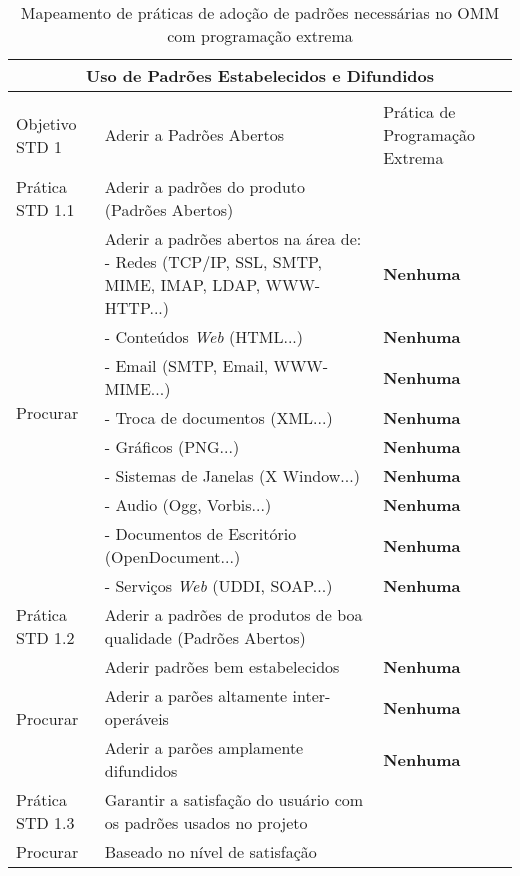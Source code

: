 \begin{longtable}{|p{2cm}|p{7cm}|p{7cm}|}
  \caption{Mapeamento de práticas de adoção de padrões necessárias no
    OMM com
    programação extrema} \\
  \multicolumn{3}{|c|}{\cellcolor[gray]{0.6} Uso de Padrões
    Estabelecidos e Difundidos}\\
  \endhead
  & & \\
  \hline \cellcolor[gray]{0.6} Objetivo STD 1 & \cellcolor[gray]{0.6}
  Aderir a Padrões Abertos & Prática de Programação Extrema \\
  \hline \cellcolor[gray]{0.9} Prática STD 1.1 & \cellcolor[gray]{0.9}
  Aderir a padrões do produto (Padrões Abertos) & \\
  \hline \multirow{9}{*}{Procurar} & Aderir a padrões abertos na área
  de: - Redes (TCP/IP, SSL, SMTP, MIME, IMAP, LDAP, WWW-HTTP...) &\textbf{Nenhuma} \\
  \cline{2-3} & - Conteúdos \textit{Web} (HTML...) &\textbf{Nenhuma} \\
  \cline{2-3} & - Email (SMTP, Email, WWW-MIME...) &\textbf{Nenhuma}
  \\
  \cline{2-3} & - Troca de documentos (XML...) &\textbf{Nenhuma} \\
  \cline{2-3} & - Gráficos (PNG...) &\textbf{Nenhuma} \\
  \cline{2-3} & - Sistemas de Janelas (X Window...) &\textbf{Nenhuma}
  \\
  \cline{2-3} & - Audio (Ogg, Vorbis...) &\textbf{Nenhuma} \\
  \cline{2-3} & - Documentos de Escritório (OpenDocument...)
  &\textbf{Nenhuma} \\
  \cline{2-3} & - Serviços \textit{Web} (UDDI, SOAP...) &\textbf{Nenhuma} \\
  \hline \cellcolor[gray]{0.9} Prática STD 1.2 & \cellcolor[gray]{0.9}
  Aderir a padrões de produtos de boa qualidade (Padrões Abertos) & \\
  \hline \multirow{3}{*}{Procurar} & Aderir padrões bem estabelecidos
  &
  \textbf{Nenhuma} \\
  \cline{2-3} & Aderir a parões altamente inter-operáveis &
  \textbf{Nenhuma} \\
  \cline{2-3} & Aderir a parões amplamente difundidos &
  \textbf{Nenhuma} \\
  \hline \cellcolor[gray]{0.9} Prática STD 1.3 & \cellcolor[gray]{0.9}
  Garantir a satisfação do usuário com os padrões usados no projeto & \\
  \hline \multirow{8}{*}{Procurar} & Baseado no nível de satisfação

\end{longtable}
